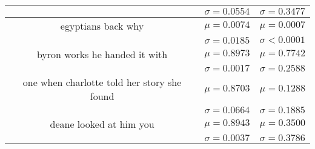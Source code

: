 \begin{table}[tbp]
\begin{center}
\begin{tabular}{ccc}
                                                      & \(\sigma=0.0554\)                                 & \(\sigma=0.3477\)           \\
            \midrule
            egyptians back      why                   & \(\mu=0.0074\)                                    & \(\mu=0.0007\)              \\
                                                      & \(\sigma=0.0185\)                                 & \(\sigma<0.0001\)           \\
            \midrule
            byron works   he handed it with           & \(\mu=0.8973\)                                    & \(\mu=0.7742\)              \\
                                                      & \(\sigma=0.0017\)                                 & \(\sigma=0.2588\)           \\
            \midrule
            one when charlotte told her story she found& \(\mu=0.8703\)                                    & \(\mu=0.1288\)              \\
                                                      & \(\sigma=0.0664\)                                 & \(\sigma=0.1885\)           \\
            \midrule
            deane looked at him    you                & \(\mu=0.8943\)                                    & \(\mu=0.3500\)              \\
                                                      & \(\sigma=0.0037\)                                 & \(\sigma=0.3786\)           \\
            \bottomrule
        \end{tabular}\label{tab6}
    \end{center}
\end{table}